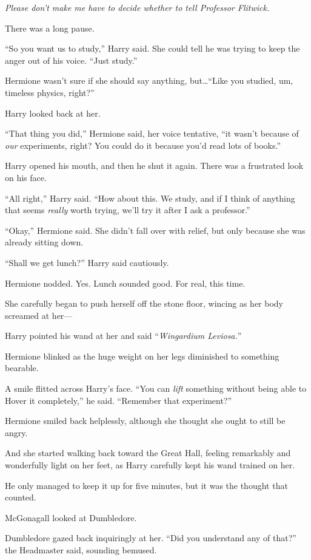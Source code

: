 \emph{Please don’t make me have to decide whether to tell Professor Flitwick.}

There was a long pause.

“So you want us to study,” Harry said. She could tell he was trying to keep the anger out of his voice. “Just study.”

Hermione wasn’t sure if she should say anything, but…“Like you studied, um, timeless physics, right?”

Harry looked back at her.

“That thing you did,” Hermione said, her voice tentative, “it wasn’t because of \emph{our} experiments, right? You could do it because you’d read lots of books.”

Harry opened his mouth, and then he shut it again. There was a frustrated look on his face.

“All right,” Harry said. “How about this. We study, and if I think of anything that seems \emph{really} worth trying, we’ll try it after I ask a professor.”

“Okay,” Hermione said. She didn’t fall over with relief, but only because she was already sitting down.

“Shall we get lunch?” Harry said cautiously.

Hermione nodded. Yes. Lunch sounded good. For real, this time.

She carefully began to push herself off the stone floor, wincing as her body screamed at her—

Harry pointed his wand at her and said “\emph{Wingardium Leviosa.}”

Hermione blinked as the huge weight on her legs diminished to something bearable.

A smile flitted across Harry’s face. “You can \emph{lift} something without being able to Hover it completely,” he said. “Remember that experiment?”

Hermione smiled back helplessly, although she thought she ought to still be angry.

And she started walking back toward the Great Hall, feeling remarkably and wonderfully light on her feet, as Harry carefully kept his wand trained on her.

He only managed to keep it up for five minutes, but it was the thought that counted.

\later

McGonagall looked at Dumbledore.

Dumbledore gazed back inquiringly at her. “Did you understand any of that?” the Headmaster said, sounding bemused.


